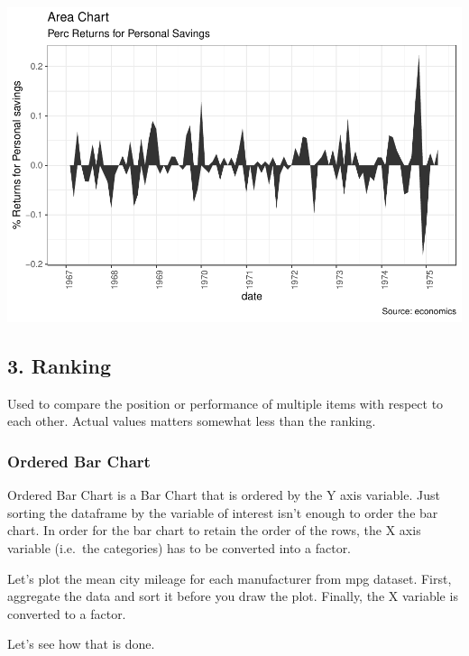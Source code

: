 \documentclass[a4paper]{article}
\begin{document}
\includegraphics{M24-ggplot2_Gallery_files/figure-latex/unnamed-chunk-15-1.pdf}

\newpage

\subsection{3. Ranking}\label{ranking}

Used to compare the position or performance of multiple items with
respect to each other. Actual values matters somewhat less than the
ranking.

\subsubsection{Ordered Bar Chart}\label{ordered-bar-chart}

Ordered Bar Chart is a Bar Chart that is ordered by the Y axis variable.
Just sorting the dataframe by the variable of interest isn't enough to
order the bar chart. In order for the bar chart to retain the order of
the rows, the X axis variable (i.e.~the categories) has to be converted
into a factor.

Let's plot the mean city mileage for each manufacturer from mpg dataset.
First, aggregate the data and sort it before you draw the plot. Finally,
the X variable is converted to a factor.

Let's see how that is done.
\end{document}
